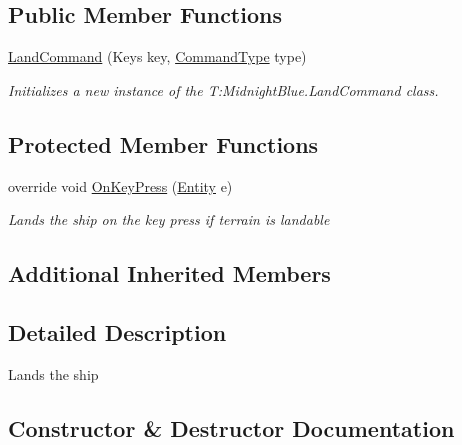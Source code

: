 \subsection*{Public Member Functions}
\begin{DoxyCompactItemize}
\item 
\hyperlink{class_midnight_blue_1_1_land_command_a936907822e22547099ec5267628fd457}{Land\+Command} (Keys key, \hyperlink{namespace_m_b2_d_1_1_i_o_ab5f95f3fe9e652778b62bdf943168a68}{Command\+Type} type)
\begin{DoxyCompactList}\small\item\em Initializes a new instance of the T\+:\+Midnight\+Blue.\+Land\+Command class. \end{DoxyCompactList}\end{DoxyCompactItemize}
\subsection*{Protected Member Functions}
\begin{DoxyCompactItemize}
\item 
override void \hyperlink{class_midnight_blue_1_1_land_command_a2c496d96aed4498bb3ca133fcea4b172}{On\+Key\+Press} (\hyperlink{class_m_b2_d_1_1_entity_component_1_1_entity}{Entity} e)
\begin{DoxyCompactList}\small\item\em Lands the ship on the key press if terrain is landable \end{DoxyCompactList}\end{DoxyCompactItemize}
\subsection*{Additional Inherited Members}


\subsection{Detailed Description}
Lands the ship 



\subsection{Constructor \& Destructor Documentation}
\hypertarget{class_midnight_blue_1_1_land_command_a936907822e22547099ec5267628fd457}{}\label{class_midnight_blue_1_1_land_command_a936907822e22547099ec5267628fd457} 
